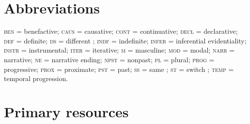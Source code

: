 \documentclass[output=paper]{LSP/langsci}
\begin{document}
\section* {Abbreviations}

\textsc{ben} = benefactive; \textsc{caus} = causative; \textsc{cont} = continuative; \textsc{decl} = declarative; \textsc{def} = definite; \textsc{ds} =  different ; \textsc{indf} = indefinite; \textsc{infer} = inferential evidentiality; \textsc{instr} = instrumental; \textsc{iter} = iterative; \textsc{m} =  masculine; \textsc{mod} = modal; \textsc{narr} = narrative; \textsc{ne} = narrative ending; \textsc{npst} = nonpast; \textsc{pl} = plural; \textsc{prog} =  progressive; \textsc{prox} = proximate; \textsc{pst} = past; \textsc{ss} = same ; \textsc{st} = switch ; \textsc{temp} = temporal progression.

\section*{Primary resources}
\end{document}
